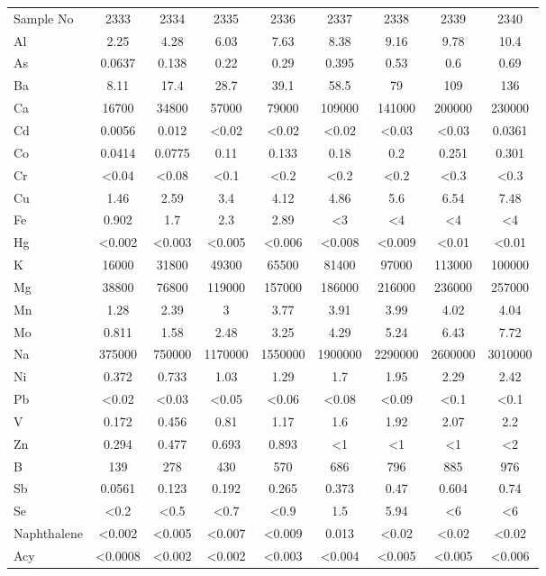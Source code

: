 \documentclass[algorithms,article,submit,pdftex,moreauthors]{Definitions/mdpi}
\begin{document}
\begin{scriptsize}
\begin{center}
\begin{longtable}{@{\extracolsep{\fill}}|p{1.8cm}|cccccccc|@{}}
Sample No & 2333 & 2334 & 2335 & 2336 & 2337 & 2338 & 2339 & 2340 \\
Al & 2.25 & 4.28 & 6.03 & 7.63 & 8.38 & 9.16 & 9.78 & 10.4 \\
As & 0.0637 & 0.138 & 0.22 & 0.29 & 0.395 & 0.53 & 0.6 & 0.69 \\
Ba & 8.11 & 17.4 & 28.7 & 39.1 & 58.5 & 79 & 109 & 136 \\
Ca & 16700 & 34800 & 57000 & 79000 & 109000 & 141000 & 200000 & 230000 \\
Cd & 0.0056 & 0.012 & <0.02 & <0.02 & <0.02 & <0.03 & <0.03 & 0.0361 \\
Co & 0.0414 & 0.0775 & 0.11 & 0.133 & 0.18 & 0.2 & 0.251 & 0.301 \\
Cr & <0.04 & <0.08 & <0.1 & <0.2 & <0.2 & <0.2 & <0.3 & <0.3 \\
Cu & 1.46 & 2.59 & 3.4 & 4.12 & 4.86 & 5.6 & 6.54 & 7.48 \\
Fe & 0.902 & 1.7 & 2.3 & 2.89 & <3 & <4 & <4 & <4 \\
Hg & <0.002 & <0.003 & <0.005 & <0.006 & <0.008 & <0.009 & <0.01 & <0.01  \\
K & 16000 & 31800 & 49300 & 65500 & 81400 & 97000 & 113000 & 100000 \\
Mg & 38800 & 76800 & 119000 & 157000 & 186000 & 216000 & 236000 & 257000 \\
Mn & 1.28 & 2.39 & 3 & 3.77 & 3.91 & 3.99 & 4.02 & 4.04 \\
Mo & 0.811 & 1.58 & 2.48 & 3.25 & 4.29 & 5.24 & 6.43 & 7.72  \\
Na & 375000 & 750000 & 1170000 & 1550000 & 1900000 & 2290000 & 2600000 & 3010000 \\
Ni & 0.372 & 0.733 & 1.03 & 1.29 & 1.7 & 1.95 & 2.29 & 2.42  \\
Pb & <0.02 & <0.03 & <0.05 & <0.06 & <0.08 & <0.09 & <0.1 &  <0.1 \\
V & 0.172 & 0.456 & 0.81 & 1.17 & 1.6 & 1.92 & 2.07 & 2.2 \\
Zn & 0.294 & 0.477 & 0.693 & 0.893 & <1 & <1 & <1 & <2 \\
B & 139 & 278 & 430 & 570 & 686 & 796 & 885 & 976 \\
Sb & 0.0561 & 0.123 & 0.192 & 0.265 & 0.373 & 0.47 & 0.604 & 0.74 \\
Se & <0.2 & <0.5 & <0.7 & <0.9 & 1.5 & 5.94 & <6 & <6 \\
Naphthalene & <0.002 & <0.005 & <0.007 & <0.009 & 0.013 & <0.02 & <0.02 & <0.02 \\
Acy & <0.0008 & <0.002 & <0.002 & <0.003 & <0.004 & <0.005 & <0.005 & <0.006 \\

\end{longtable}
\end{center}
\end{scriptsize}
\end{document}
